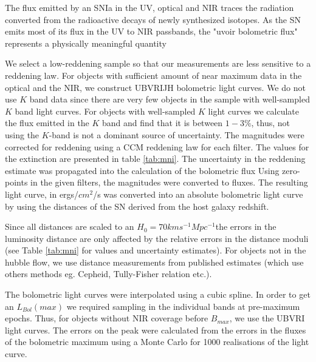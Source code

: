 The flux emitted by an SNIa in the UV, optical and NIR traces the radiation converted from the radioactive decays of newly synthesized isotopes.
As the SN emits most of its flux in the UV to NIR passbands, the "uvoir bolometric flux" represents a physically meaningful quantity \citep{Suntzeff1996}

We select a low-reddening sample so that our measurements are less sensitive to a reddening law. 
For objects with sufficient amount of near maximum data in the optical and the NIR, we construct UBVRIJH bolometric light curves. We do not use $K$ band data since there are very few objects in the sample with well-sampled $K$ band light curves. For objects with well-sampled $K$ light curves we calculate the flux emitted in the $K$ band and find that it is between $1-3 \%$, thus, not using the $K$-band is not a dominant source of uncertainty. 
The magnitudes were corrected 
for reddening using a CCM reddening law for each filter. The values for the extinction are presented in table \ref{tab:mni}. The uncertainty in the reddening estimate
was propagated into the calculation of the bolometric flux
Using zero-points in the given filters, the magnitudes were converted to fluxes. 
The resulting light curve, in ergs/$cm^2$/s  was converted into an absolute bolometric light curve 
by using the distances of the SN derived from the host galaxy redshift. 

Since all distances are scaled to an $H_0=70 km s^{-1} Mpc ^{-1}$the errors in the luminosity distance are only affected by the relative errors in the 
distance moduli (see Table \ref{tab:mni} for values and uncertainty estimates). For objects not in the hubble flow, we use distance measurements from published estimates (which use others methods eg. Cepheid, Tully-Fisher relation etc.). 

The bolometric light curves were interpolated using a cubic spline. 
In order to get an $L_{Bol}(max)$ we required sampling in the individual bands at pre-maximum epochs. Thus, for objects without NIR coverage before $B_{max}$, we use the UBVRI light curves. 
The errors on the peak were calculated from the errors in the fluxes of the bolometric maximum using a Monte Carlo for 1000 realisations of the light curve.  


\iffalse
